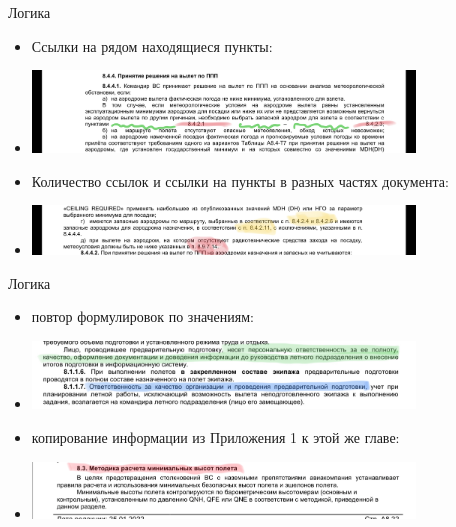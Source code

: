 \documentclass[utf8]{beamer}
\begin{document}
\begin{frame}{Логика}  
    \begin{itemize}
        \item <1-> Ссылки на рядом находящиеся пункты:
        \item <1-> \includegraphics[width=0.8\textwidth]{Logic1.png} 
        \item <2-> Количество ссылок и ссылки на пункты в разных частях документа:
        \item <2-> \includegraphics[width=0.8\textwidth]{Logic2.png}
    \end{itemize}              
\end{frame}

\begin{frame}{Логика}  
    \begin{itemize}
        \item <1-> повтор формулировок по значениям:
        \item <1-> \includegraphics[width=0.8\textwidth]{Logic3.png} 
        \item <2-> копирование информации из Приложения 1 к этой же главе:
        \item <2-> \includegraphics[width=0.8\textwidth]{Logic5.png}
    \end{itemize}              
\end{frame}
\end{document}
